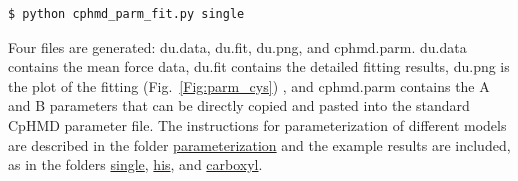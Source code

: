 \begin{lstlisting}
$ python cphmd_parm_fit.py single
\end{lstlisting}

Four files are generated: du.data, du.fit, du.png, and cphmd.parm. du.data contains the mean force data, du.fit contains the detailed fitting results, du.png is the plot of the fitting (Fig.~\ref{Fig:parm_cys}) , and cphmd.parm contains the A and B parameters that can be directly copied and pasted into the standard CpHMD parameter file. 
The instructions for parameterization of different models are described in the folder \href{https://gitlab.com/shenlab-amber-cphmd/cphmd-tutorial/-/tree/main/parameterization}{parameterization} and the example results are included, as in the folders 
\href{https://gitlab.com/shenlab-amber-cphmd/cphmd-tutorial/-/tree/main/parameterization/single}{single},
\href{https://gitlab.com/shenlab-amber-cphmd/cphmd-tutorial/-/tree/main/parameterization/his}{his},
and 
\href{https://gitlab.com/shenlab-amber-cphmd/cphmd-tutorial/-/tree/main/parameterization/carboxyl}
{carboxyl}. 




